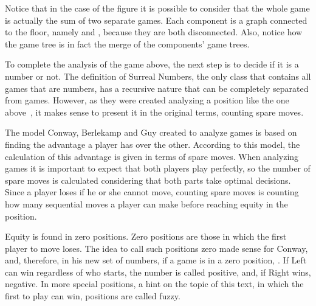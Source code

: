 Notice that in the case of the figure it is possible to consider that the whole game is actually the sum of two separate games. Each component is a graph connected to the floor, namely
 and 
, because they are both disconnected.
Also, notice how the game tree is in fact the merge of the components' game trees.

To complete the analysis of the game above, the next step is to decide if it is a number or not. The definition of Surreal Numbers, the only class that contains all games that are numbers, has a recursive nature that can be completely separated from games. However, as they were created analyzing a position like the one above~\cite{CGT}, it makes sense to present it in the original terms, counting spare moves.

The model Conway, Berlekamp and Guy created to analyze games is based on finding the advantage a player has over the other. According to this model, the calculation of this advantage is given in terms of spare moves. When analyzing games it is important to expect that both players play perfectly, so the number of spare moves is calculated considering that both parts take optimal decisions. Since a player loses if he or she cannot move, counting spare moves is counting how many sequential moves a player can make before reaching equity in the position.

Equity is found in zero positions. Zero positions are those in which the first player to move loses. The idea to call such positions zero made sense for Conway, and, therefore, in his new set of numbers, if a game \Gm{} is in a zero position, . If Left can win regardless of who starts, the number is called positive, and, if Right wins, negative. In more special positions, a hint on the topic of this text, in which the first to play can win, positions are called fuzzy.

